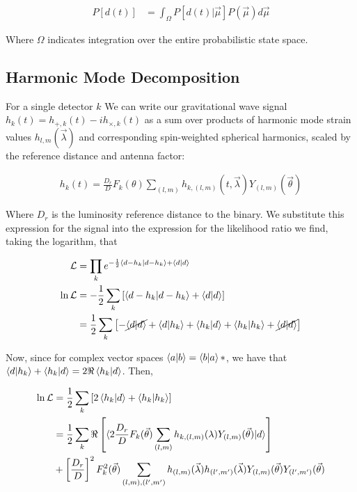 \documentclass[paper=a4, fontsize=11pt]{scrartcl} %
\numberwithin{equation}{section} %
\numberwithin{figure}{section} %
\numberwithin{table}{section} %
\begin{document}
\begin{align}
P[d(t)] &= \int_{\Omega}P[d(t)|\vec{\mu}]P(\vec{\mu})d\vec{\mu}
\end{align}

Where $\Omega$ indicates integration over the entire probabilistic state space.


\subsection{Harmonic Mode Decomposition}

For a single detector $k$ We can write our gravitational wave signal $h_k(t) = h_{+,k}(t) - ih_{\times, k}(t)$ as a sum over products of harmonic mode strain values $h_{l,m}(\vec{\lambda})$ and corresponding spin-weighted spherical harmonics, scaled by the reference distance and antenna factor:

\begin{align}
h_k(t) = \frac{D_r}{D}F_k(\theta)\sum_{(l,m)}h_{k, (l,m)}(t, \vec{\lambda})Y_{(l,m)}(\vec{\theta})
\end{align}

Where $D_r$ is the luminosity reference distance to the binary. We substitute this expression for the signal into the expression for the likelihood ratio we find, taking the logarithm, that

\begin{align}
\mathcal{L} &= \prod_k e^{-\frac{1}{2}\braket{d - h_k|d-h_k} + \braket{d|d}} \\
\ln\mathcal{L} &= -\frac{1}{2}\sum_{k}\left[\braket{d - h_k|d-h_k} + \braket{d|d}\right] \\
&= \frac{1}{2}\sum_{k}\left[-\cancel{\braket{d|d}}+\braket{d|h_k}+\braket{h_k|d}+\braket{h_k|h_k} + \cancel{\braket{d|d}}\right] \\
\end{align}

Now, since for complex vector spaces $\braket{a|b} = \braket{b|a}*$, we have that $\braket{d|h_k} + \braket{h_k|d} = 2\Re\braket{h_k|d}$. Then, 

\begin{align}
\ln\mathcal{L} &= \frac{1}{2}\sum_{k}\left[2\braket{h_k|d} + \braket{h_k|h_k}\right] \\
&= \frac{1}{2} \sum_{k}\Re\left[\braket{2\frac{D_r}{D}F_k(\vec{\theta})\sum_{(l,m)}h_{k,(l,m)}(\lambda)Y_{(l,m)}(\vec{\theta})|d}\right] \\
&+ \left[\frac{D_r}{D}\right]^2F_k^2(\vec{\theta})\sum_{(l,m),(l',m')}h_{(l,m)}(\vec{\lambda})h_{(l',m')}(\vec{\lambda})Y_{(l,m)}(\vec{\theta})Y_{(l',m')}(\vec{\theta})
\end{align}  
\end{document}
